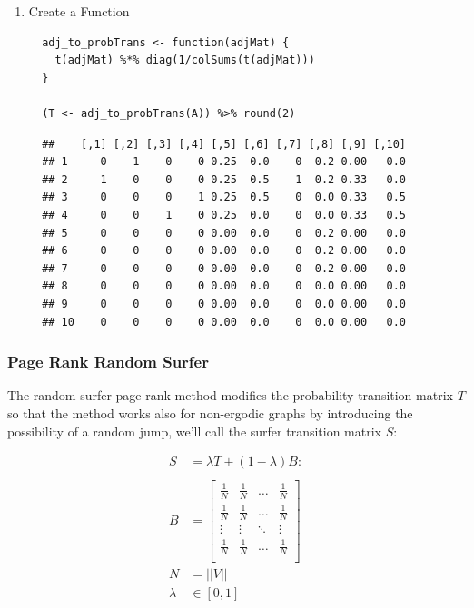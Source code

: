 \documentclass[11pt]{article}
\begin{document}
\begin{enumerate}
\begin{enumerate}
\item Create a Function
\label{sec:orgc57a2a2}
\begin{verbatim}
  adj_to_probTrans <- function(adjMat) {
    t(adjMat) %*% diag(1/colSums(t(adjMat)))
  }

  (T <- adj_to_probTrans(A)) %>% round(2)
\end{verbatim}

\begin{verbatim}
  ##    [,1] [,2] [,3] [,4] [,5] [,6] [,7] [,8] [,9] [,10]
  ## 1     0    1    0    0 0.25  0.0    0  0.2 0.00   0.0
  ## 2     1    0    0    0 0.25  0.5    1  0.2 0.33   0.0
  ## 3     0    0    0    1 0.25  0.5    0  0.0 0.33   0.5
  ## 4     0    0    1    0 0.25  0.0    0  0.0 0.33   0.5
  ## 5     0    0    0    0 0.00  0.0    0  0.2 0.00   0.0
  ## 6     0    0    0    0 0.00  0.0    0  0.2 0.00   0.0
  ## 7     0    0    0    0 0.00  0.0    0  0.2 0.00   0.0
  ## 8     0    0    0    0 0.00  0.0    0  0.0 0.00   0.0
  ## 9     0    0    0    0 0.00  0.0    0  0.0 0.00   0.0
  ## 10    0    0    0    0 0.00  0.0    0  0.0 0.00   0.0
\end{verbatim}
\end{enumerate}
\end{enumerate}

\subsubsection{Page Rank Random Surfer}
\label{sec:org9cdc1f7}
The random surfer page rank method modifies the probability transition
matrix \(T\) so that the method works also for non-ergodic graphs by
introducing the possibility of a random jump, we'll call the surfer
transition matrix \(S\):

\begin{align}
    S &= \lambda T +  \left( 1- \lambda \right)B :\\
\ \\
    B&= \begin{bmatrix}
    \frac{1}{N} & \frac{1}{N} & \ldots & \frac{1}{N} \\
    \frac{1}{N} & \frac{1}{N} & \ldots & \frac{1}{N} \\
        \vdots      & \vdots      & \ddots & \vdots \\
    \frac{1}{N} & \frac{1}{N} & \ldots & \frac{1}{N} \\
    \end{bmatrix}  \\
    N&= \left| \left| V \right| \right| \\
    \lambda &\in [0,1]
\end{align}
\end{document}
